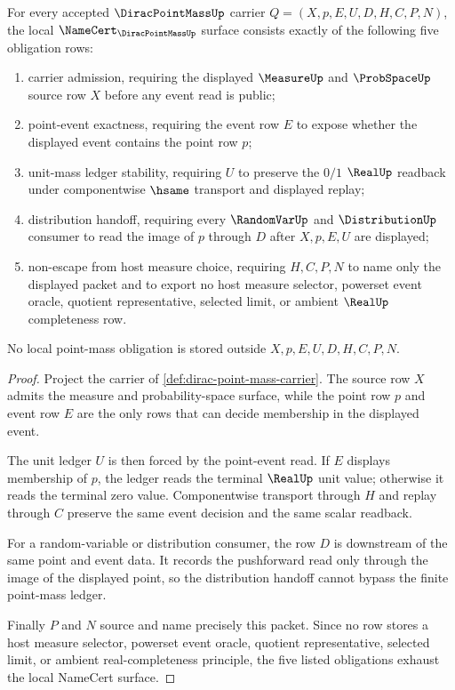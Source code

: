 \begin{theorem}
\label{thm:dirac-point-mass-namecert-obligations}
For every accepted $\DiracPointMassUp$ carrier $Q=(X,p,E,U,D,H,C,P,N)$, the local $\NameCert_{\DiracPointMassUp}$ surface consists exactly of the following five obligation rows:
\begin{enumerate}
\item carrier admission, requiring the displayed $\MeasureUp$ and $\ProbSpaceUp$ source row $X$ before any event read is public;
\item point-event exactness, requiring the event row $E$ to expose whether the displayed event contains the point row $p$;
\item unit-mass ledger stability, requiring $U$ to preserve the $0/1$ $\RealUp$ readback under componentwise $\hsame$ transport and displayed replay;
\item distribution handoff, requiring every $\RandomVarUp$ and $\DistributionUp$ consumer to read the image of $p$ through $D$ after $X,p,E,U$ are displayed;
\item non-escape from host measure choice, requiring $H,C,P,N$ to name only the displayed packet and to export no host measure selector, powerset event oracle, quotient representative, selected limit, or ambient $\RealUp$ completeness row.
\end{enumerate}
No local point-mass obligation is stored outside $X,p,E,U,D,H,C,P,N$.
\end{theorem}
\begin{proof}
Project the carrier of \autoref{def:dirac-point-mass-carrier}. The source row $X$ admits the measure and probability-space surface, while the point row $p$ and event row $E$ are the only rows that can decide membership in the displayed event.

The unit ledger $U$ is then forced by the point-event read. If $E$ displays membership of $p$, the ledger reads the terminal $\RealUp$ unit value; otherwise it reads the terminal zero value. Componentwise transport through $H$ and replay through $C$ preserve the same event decision and the same scalar readback.

For a random-variable or distribution consumer, the row $D$ is downstream of the same point and event data. It records the pushforward read only through the image of the displayed point, so the distribution handoff cannot bypass the finite point-mass ledger.

Finally $P$ and $N$ source and name precisely this packet. Since no row stores a host measure selector, powerset event oracle, quotient representative, selected limit, or ambient real-completeness principle, the five listed obligations exhaust the local NameCert surface.
\end{proof}

